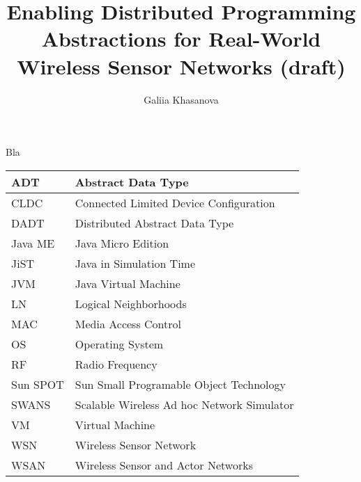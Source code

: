 \documentclass[msc, openright, a4paper]{TNthesis}
\title{Enabling Distributed Programming Abstractions for Real-World
Wireless Sensor Networks (draft)}
\author{Galiia Khasanova}
\newcommand\B{\rule[-1.7ex]{0pt}{0pt}} %
\newcommand\T{\rule{0pt}{3.1ex}} %
\begin{document}
 

\begin{preliminary}
\maketitle 

\standarddeclaration

\begin{acknowledgements}
	Bla
\end{acknowledgements}

\begin{acronyms}
	\begin{center}
	\begin{tabular}{| l |p{9cm}|}
	\hline
	ADT \T \B & Abstract Data Type \\
	\hline
	CLDC \T \B & Connected Limited Device Configuration \\
	\hline
	DADT \T \B & Distributed Abstract Data Type \\
	\hline
	Java ME \T \B & Java Micro Edition \\
	\hline
	JiST \T \B & Java in Simulation Time \\
	\hline
	JVM \T \B & Java Virtual Machine \\
	\hline 
	LN \T \B & Logical Neighborhoods \\
	\hline
	MAC \T \B & Media Access Control \\
	\hline
	OS \T \B & Operating System \\
	\hline
	RF \T \B & Radio Frequency \\
	\hline
	Sun SPOT \T \B & Sun Small Programable Object Technology \\
	\hline
	SWANS \T \B & Scalable Wireless Ad hoc Network Simulator \\
	\hline
	VM \T \B & Virtual Machine \\
	\hline
	WSN \T \B & Wireless Sensor Network \\
	\hline
	WSAN \T \B & Wireless Sensor and Actor Networks \\
	\hline
	\end{tabular}
	\end{center}
\end{acronyms}


\tableofcontents
\listoffigures
\listoftables
\end{preliminary} 








\end{document}
